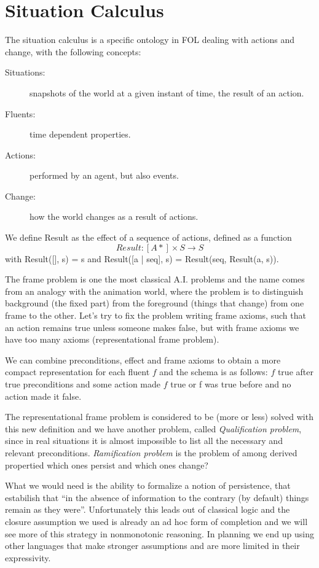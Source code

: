 \section{Situation Calculus}
The situation calculus is a specific ontology in FOL dealing with actions and change,
with the following concepts:
\begin{description}
    \item [Situations: ] snapshots of the world at a given instant of time,
	                 the result of an action.
    \item [Fluents: ]    time dependent properties.
    \item [Actions: ]    performed by an agent, but also events.
    \item [Change: ]     how the world changes as a result of actions.
\end{description}
We define Result as the effect of a sequence of actions, defined as a function
\[ Result: [A*] \times S \to S \]
with Result([], s) = s and Result([a | seq], s) = Result(seq, Result(a, s)).

The frame problem is one the most classical A.I. problems and the name comes from 
an analogy with the animation world, where the problem is to distinguish background
(the fixed part) from the foreground (things that change) from one frame to the other.
Let’s try to fix the problem writing frame axioms, such that an action remains true
unless someone makes false, but with frame axioms we have too many axioms
(representational frame problem).

We can combine preconditions, effect and frame axioms to obtain a more compact 
representation for each fluent $f$ and the schema is as follows:
$f$ true after true preconditions and some action made $f$ true or
f was true before and no action made it false.

The representational frame problem is considered to be (more or less) solved with 
this new definition and we have another problem, called \emph{Qualification problem},
since in real situations it is almost impossible to list
all the necessary and relevant preconditions.\newline
\emph{Ramification problem} is the problem of among derived propertied which ones
persist and which ones change?

What we would need is the ability to formalize a notion of persistence, that estabilish
that “in the absence of information to the contrary (by default)
things remain as they were”.\newline
Unfortunately this leads out of classical logic and the closure assumption we used 
is already an ad hoc form of completion and we will see more
of this strategy in nonmonotonic reasoning.\newline
In planning we end up using other languages that make stronger assumptions
and are more limited in their expressivity.

